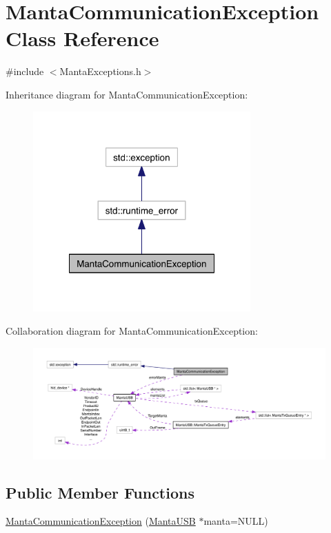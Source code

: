 \hypertarget{classMantaCommunicationException}{\section{\-Manta\-Communication\-Exception \-Class \-Reference}
\label{classMantaCommunicationException}
}


{\ttfamily \#include $<$\-Manta\-Exceptions.\-h$>$}



\-Inheritance diagram for \-Manta\-Communication\-Exception\-:\nopagebreak
\begin{figure}[H]
\begin{center}
\leavevmode
\includegraphics[width=236pt]{classMantaCommunicationException__inherit__graph}
\end{center}
\end{figure}


\-Collaboration diagram for \-Manta\-Communication\-Exception\-:\nopagebreak
\begin{figure}[H]
\begin{center}
\leavevmode
\includegraphics[width=350pt]{classMantaCommunicationException__coll__graph}
\end{center}
\end{figure}
\subsection*{\-Public \-Member \-Functions}
\begin{DoxyCompactItemize}
\item 
\hyperlink{classMantaCommunicationException_a5f590dc89fbdc4e2477c80819a2e4daa}{\-Manta\-Communication\-Exception} (\hyperlink{classMantaUSB}{\-Manta\-U\-S\-B} $\ast$manta=\-N\-U\-L\-L)
\end{DoxyCompactItemize}
